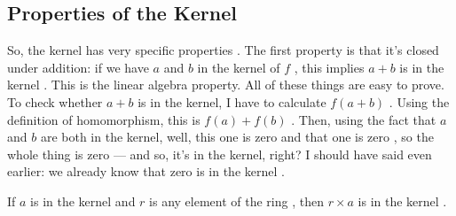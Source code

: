 \subsection{Properties of the Kernel}

\begin{speech}[00:33:17 - 00:34:49]
So, the kernel has very specific properties . The first property is that it's closed under addition: if we have $a$ and $b$ in the kernel of $f$ , this implies $a + b$ is in the kernel . This is the linear algebra property. All of these things are easy to prove. To check whether $a + b$ is in the kernel, I have to calculate $f(a + b)$ . Using the definition of homomorphism, this is $f(a) + f(b)$ . Then, using the fact that $a$ and $b$ are both in the kernel, well, this one is zero  and that one is zero , so the whole thing is zero  --- and so, it's in the kernel, right? I should have said even earlier: we already know that zero is in the kernel .

If $a$ is in the kernel  and $r$ is any element of the ring , then $r \times a$ is in the kernel .
\end{speech}

